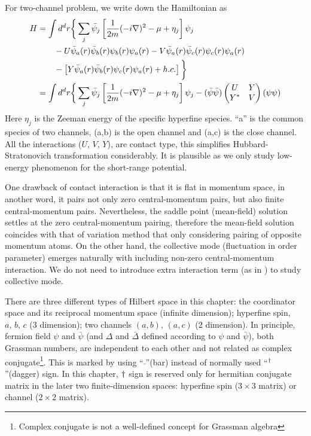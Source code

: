 For two-channel problem, we write down the Hamiltonian as
\begin{equation}\label{eq:pathInt2:ham2}
\begin{split}
H&=\int{d^{d}r}\bigg\{\sum_{j}\bar\psi_{j}\left[\frac{1}{2m}(-i\nabla)^{2}-\mu+\eta_{j}\right]\psi_{j}\\
	&\qquad-U\bar\psi_{a}(r)\bar\psi_{b}(r)\psi_{b}(r)\psi_{a}(r)-V\bar\psi_{a}(r)\bar\psi_{c}(r)\psi_{c}(r)\psi_{a}(r)\\
	&\qquad-\left[Y\bar\psi_{a}(r)\bar\psi_{b}(r)\psi_{c}(r)\psi_{a}(r)+h.c.\right]
	\bigg\}\\
 &=\int{d^{d}r}\bigg\{\sum_{j}\bar\psi_{j}\left[\frac{1}{2m}(-i\nabla)^{2}-\mu+\eta_{j}\right]\psi_{j}
 	-(\bar\psi\bar\psi)\begin{pmatrix}U&Y\\Y^{*}&V\end{pmatrix}(\psi\psi)
\end{split}
\end{equation}
Here $\eta_{j}$ is the Zeeman energy of the specific hyperfine species.  ``a'' is the common species of two channels, (a,b) is the open channel and (a,c) is the close channel.  All the interactions ($U$, $V$, $Y$), are contact type, this simplifies Hubbard-Stratonovich transformation considerably.  It is plausible as we only study low-energy phenomenon for the short-range potential. 

One drawback of contact interaction is that it is flat in momentum space, in another word, it pairs not only zero central-momentum pairs, but also finite central-momentum pairs.  Nevertheless, the saddle point (mean-field) solution settles at the zero central-momentum pairing, therefore the mean-field solution coincides with that of  variation method that only considering pairing of opposite momentum atoms.  On the other hand, the collective mode (fluctuation in order parameter) emerges naturally with including non-zero central-momentum interaction.  We do not need to introduce extra interaction term (as in \cite{AndersonBCS}) to study collective mode.   

There are three different types of Hilbert space in this chapter:  the coordinator space and its reciprocal momentum space (infinite dimension);   hyperfine spin, $a,\,b,\,c$ (3 dimension);  two channels $(a,b),\,(a,c)$ (2 dimension).  In principle, fermion field $\psi$ and $\bar\psi$ (and $\Delta$ and $\bar\Delta$ defined according to $\psi$ and $\bar\psi$),  both Grassman numbers, are independent to each other  and  not related as complex conjugate\footnote{Complex conjugate is not a well-defined concept for Grassman algebra}.  This is marked by using ``$\bar{\;}$''(bar) instead of normally used ``$^{\dagger}$''(dagger) sign. In this chapter, $^{}\dagger$ sign is reserved only for hermitian conjugate matrix in the later two finite-dimension spaces: hyperfine spin ($3\times3$ matrix) or channel ($2\times2$ matrix). 

